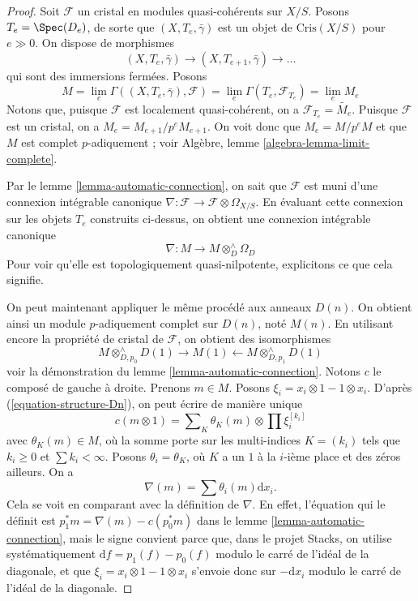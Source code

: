 \begin{proof}
Soit $\mathcal{F}$ un cristal en modules quasi-cohérents sur $X/S$.
Posons $T_e = \Spec(D_e)$, de sorte que $(X, T_e, \bar\gamma)$ est un objet
de $\text{Cris}(X/S)$ pour $e \gg 0$. On dispose de morphismes
$$
(X, T_e, \bar\gamma) \to (X, T_{e + 1}, \bar\gamma) \to \ldots
$$
qui sont des immersions fermées. Posons
$$
M =
\lim_e \Gamma((X, T_e, \bar\gamma), \mathcal{F}) =
\lim_e \Gamma(T_e, \mathcal{F}_{T_e}) = \lim_e M_e
$$
Notons que, puisque $\mathcal{F}$ est localement quasi-cohérent, on a
$\mathcal{F}_{T_e} = \widetilde{M_e}$. Puisque $\mathcal{F}$ est un
cristal, on a $M_e = M_{e + 1}/p^eM_{e + 1}$. On voit donc que
$M_e = M/p^eM$ et que $M$ est complet $p$-adiquement ; voir
Algèbre, lemme \ref{algebra-lemma-limit-complete}.

\medskip\noindent
Par le lemme \ref{lemma-automatic-connection}, on sait que $\mathcal{F}$
est muni d'une connexion intégrable canonique
$\nabla : \mathcal{F} \to \mathcal{F} \otimes \Omega_{X/S}$.
En évaluant cette connexion sur les objets $T_e$ construits ci-dessus,
on obtient une connexion intégrable canonique
$$
\nabla : M \longrightarrow M \otimes^\wedge_D \Omega_D
$$
Pour voir qu'elle est topologiquement quasi-nilpotente, explicitons ce que cela signifie.

\medskip\noindent
On peut maintenant appliquer le même procédé aux anneaux $D(n)$.
On obtient ainsi un module $p$-adiquement complet sur $D(n)$, noté $M(n)$. En utilisant encore
la propriété de cristal de $\mathcal{F}$, on obtient des isomorphismes
$$
M \otimes^\wedge_{D, p_0} D(1) \rightarrow M(1)
\leftarrow M \otimes^\wedge_{D, p_1} D(1)
$$
voir la démonstration du lemme \ref{lemma-automatic-connection}.
Notons $c$ le composé de gauche à droite. Prenons $m \in M$.
Posons $\xi_i = x_i \otimes 1 - 1 \otimes x_i$.
D'après (\ref{equation-structure-Dn}), on peut écrire de manière unique
$$
c(m \otimes 1) = \sum\nolimits_K \theta_K(m) \otimes \prod \xi_i^{[k_i]}
$$
avec $\theta_K(m) \in M$, où la somme porte sur les multi-indices
$K = (k_i)$ tels que $k_i \geq 0$ et $\sum k_i < \infty$. Posons
$\theta_i = \theta_K$, où $K$ a un $1$ à la $i$-ième place et
des zéros ailleurs. On a
$$
\nabla(m) = \sum \theta_i(m) \text{d}x_i.
$$
Cela se voit en comparant avec la définition de
$\nabla$. En effet, l'équation qui le définit est
$p_1^*m = \nabla(m) - c(p_0^*m)$ dans le lemme \ref{lemma-automatic-connection},
mais le signe convient parce que, dans le projet Stacks, on utilise systématiquement
$\text{d}f = p_1(f) - p_0(f)$ modulo le carré de l'idéal de la diagonale,
et que $\xi_i = x_i \otimes 1 - 1 \otimes x_i$ s'envoie donc sur $-\text{d}x_i$
modulo le carré de l'idéal de la diagonale.


\end{proof}
